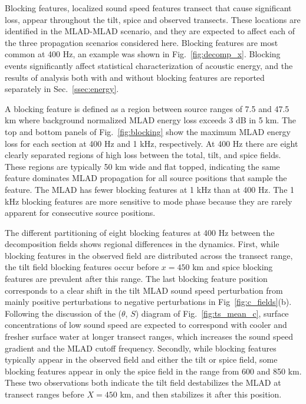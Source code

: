 \documentclass[preprint,NumberedRefs]{JASA}
\begin{document}
Blocking features, localized sound speed features transect that cause significant loss, appear throughout the tilt, spice and observed transects. These locations are identified in the MLAD-MLAD scenario, and they are expected to affect each of the three propagation scenarios considered here. Blocking features are most common at 400 Hz, an example was shown in Fig.~\ref{fig:decomp_x}. Blocking events significantly affect statistical characterization of acoustic energy, and the results of analysis both with and without blocking features are reported separately in Sec.~\ref{ssec:energy}.

A blocking feature is defined as a region between source ranges of 7.5 and 47.5 km where background normalized MLAD energy loss exceeds 3 dB in 5 km. The top and bottom panels of Fig.~\ref{fig:blocking} show the maximum MLAD energy loss for each section at 400 Hz and 1 kHz, respectively. At 400 Hz there are eight clearly separated regions of high loss between the total, tilt, and spice fields. These regions are typically 50 km wide and flat topped, indicating the same feature dominates MLAD propagation for all source positions that sample the feature. The MLAD has fewer blocking features at 1 kHz than at 400 Hz. The 1 kHz blocking features are more sensitive to mode phase because they are rarely apparent for consecutive source positions.

The different partitioning of eight blocking features at 400 Hz between the decomposition fields shows regional differences in the dynamics. First, while blocking features in the observed field are distributed across the transect range, the tilt field blocking features occur before $x=450$ km and spice blocking features are prevalent after this range. The last blocking feature position corresponds to a clear shift in the tilt MLAD sound speed perturbation from mainly positive perturbations to negative perturbations in Fig~\ref{fig:c_fields}(b). Following the discussion of the ($\theta$, $S$) diagram of Fig.~\ref{fig:ts_mean_c}, surface concentrations of low sound speed are expected to correspond with cooler and fresher surface water at longer transect ranges, which increases the sound speed gradient and the MLAD cutoff frequency. Secondly, while blocking features typically appear in the observed field and either the tilt or spice field, some blocking features appear in only the spice field in the range from 600 and 850 km. These two observations both indicate the tilt field destabilizes the MLAD at transect ranges before $X=450$ km, and then stabilizes it after this position.
\end{document}
